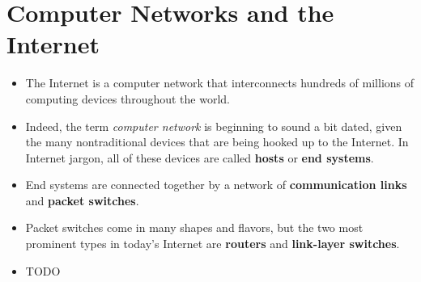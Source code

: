 \section{Computer Networks and the Internet}
\begin{itemize}

\item The Internet is a computer network that interconnects hundreds of millions of computing devices throughout the world.

\item Indeed, the term \textit{computer network} is beginning to sound a bit dated, given the many nontraditional devices that are being hooked up to the Internet. In Internet jargon, all of these devices are called \textbf{hosts} or \textbf{end systems}.

\item End systems are connected together by a network of \textbf{communication links} and \textbf{packet switches}.

\item Packet switches come in many shapes and flavors, but the two most prominent types in today's Internet are \textbf{routers} and \textbf{link-layer switches}.

\item TODO

\end{itemize}